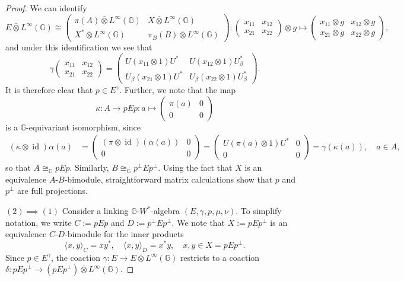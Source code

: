 \documentclass[reqno]{amsart}
\numberwithin{equation}{section}
\DeclareMathOperator{\id}{\mathrm{id}}
\newcommand{\G}{\mathbb{G}}
\newcommand{\ovot}{\bar{\otimes}}
\begin{document}
\begin{proof}
We can identify
$$E\ovot L^\infty(\G) \cong \begin{pmatrix}
    \pi(A) \ovot L^\infty(\G) & X \ovot L^\infty(\G)\\ X^*\ovot L^\infty(\G) & \pi_B(B)\ovot L^\infty(\G) \end{pmatrix}: \begin{pmatrix}
        x_{11} & x_{12} \\ x_{21} & x_{22} \end{pmatrix}
    \otimes g \mapsto \begin{pmatrix}
        x_{11} \otimes g& x_{12}\otimes g \\ x_{21}\otimes g & x_{22}\otimes g
    \end{pmatrix},
$$
and under this identification we see that
$$\gamma \begin{pmatrix}
        x_{11} & x_{12} \\ x_{21} & x_{22} \end{pmatrix} = \begin{pmatrix}
        U(x_{11}\otimes 1)U^* & U(x_{12}\otimes 1)U_\beta^* \\ U_\beta(x_{21}\otimes 1)U^* & U_\beta(x_{22}\otimes 1)U_\beta^* \end{pmatrix}.$$
        It is therefore clear that $p \in E^\gamma$. Further, we note that the map
        $$\kappa: A \to pEp: a\mapsto \begin{pmatrix}\pi(a) & 0 \\ 0 & 0\end{pmatrix}$$
        is a $\G$-equivariant isomorphism, since 
        \begin{align*}
            (\kappa \otimes \id)\alpha(a)&= \begin{pmatrix}(\pi\otimes \id)(\alpha(a)) & 0 \\ 0 & 0\end{pmatrix}= \begin{pmatrix}U(\pi(a)\otimes 1)U^* & 0 \\ 0 & 0\end{pmatrix}= \gamma(\kappa(a)), \quad a \in A,
        \end{align*}
so that $A \cong_\G pEp$. Similarly, $B \cong_\G p^\perp Ep^\perp.$ Using the fact that $X$ is an equivalence $A$-$B$-bimodule, straightforward matrix calculations show that $p$ and $p^\perp$ are full projections.
        
    $(2)\implies (1)$ Consider a linking $\G$-$W^*$-algebra $(E, \gamma, p, \mu, \nu)$. To simplify notation, we write $C:= pEp$ and $D:= p^\perp E p^\perp$. We note that $X:=pEp^\perp$ is an equivalence $C$-$D$-bimodule for the inner products
$$\langle x,y\rangle_{C} = xy^*, \quad \langle x,y\rangle_{D} = x^*y, \quad x,y \in X=pEp^\perp.$$
Since $p\in E^\gamma$, the coaction $\gamma: E \to E \ovot L^\infty(\G)$ restricts to a coaction $\delta: pEp^\perp \to (pEp^\perp)\ovot L^\infty(\G)$.


\end{proof}
\end{document}

